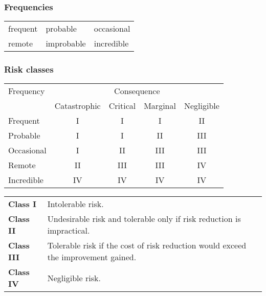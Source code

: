 \documentclass[11pt]{article}
\begin{document}
\subsubsection*{Frequencies}
        \begin{center}
            \begin{tabular}{lll}
                frequent & probable & occasional \\
                remote   & improbable & incredible
            \end{tabular}
        \end{center}

\subsubsection*{Risk classes}

\begin{center}
    \begin{tabular}{lcccc}
	\toprule
	Frequency & \multicolumn{4}{c}{Consequence}\\\cmidrule{2-5}
                  & Catastrophic & Critical & Marginal & Negligible \\
	\midrule
	Frequent & I & I & I & II \\
	Probable & I & I & II & III\\
	Occasional & I & II & III & III\\
	Remote & II & III & III & IV \\ 
	Incredible & IV & IV & IV & IV \\
	\bottomrule
    \end{tabular}
\end{center}

\begin{tabular}{ll}

\textbf{Class I} & Intolerable risk.\\

\textbf{Class II} & Undesirable risk and tolerable only if risk
	  	reduction is impractical.\\

\textbf{Class III} & Tolerable risk if the cost of risk reduction
		would exceed the improvement gained.\\

\textbf{Class IV} & Negligible risk.

\end{tabular}

\pagebreak
\end{document}
